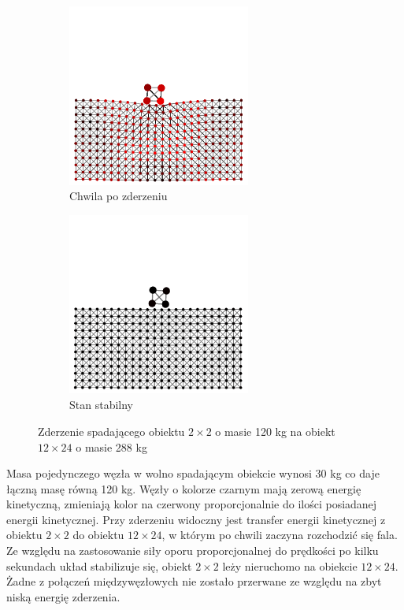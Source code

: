 \documentclass[12pt, letterpaper]{report}
\begin{document}
\begin{figure}[h]
\begin{subfigure}{0.5\textwidth}
            \includegraphics[width=6cm, height=6cm]{collision_2x2_24x12_mass30_3}
            \caption{Chwila po zderzeniu}
        \end{subfigure}
        \begin{subfigure}{0.5\textwidth}
            \centering
            \includegraphics[width=6cm, height=6cm]{collision_2x2_24x12_mass30_4}
            \caption{Stan stabilny}
        \end{subfigure}
        
        \caption{Zderzenie spadającego obiektu $2 \times 2$ o masie 120 kg na obiekt $12 \times 24$ o masie 288 kg}
    \end{figure}
    Masa pojedynczego węzła w wolno spadającym obiekcie wynosi 30 kg co daje łączną masę równą 120 kg.
    Węzły o kolorze czarnym mają zerową energię kinetyczną, 
    zmieniają kolor na czerwony proporcjonalnie do ilości posiadanej energii kinetycznej. 
    Przy zderzeniu widoczny jest transfer energii kinetycznej z obiektu $2 \times 2$ do obiektu $12 \times 24$, 
    w którym po chwili zaczyna rozchodzić się fala. Ze względu na zastosowanie siły oporu proporcjonalnej do prędkości
    po kilku sekundach układ stabilizuje się, obiekt $2 \times 2$ leży nieruchomo na obiekcie $12 \times 24$. 
    Żadne z połączeń międzywęzłowych nie zostało przerwane ze względu na zbyt niską energię zderzenia.
\end{document}
